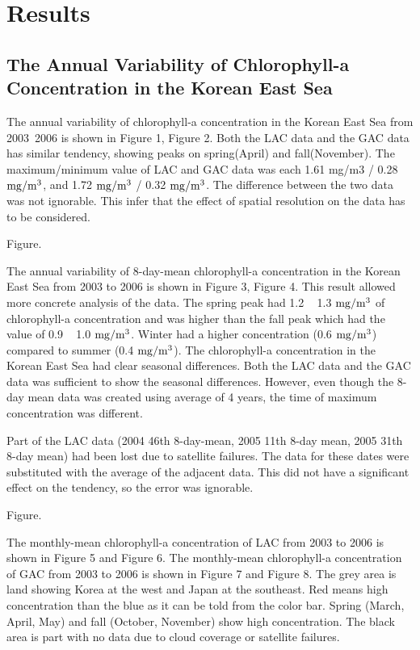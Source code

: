 \section{Results}
 
\subsection{The Annual Variability of Chlorophyll-a Concentration in the Korean East Sea}
 
The annual variability of chlorophyll-a concentration in the Korean East Sea from 2003~2006 is shown in Figure 1, Figure 2. Both the LAC data and the GAC data has similar tendency, showing peaks on spring(April) and fall(November). The maximum/minimum value of LAC and GAC data was each 1.61 mg/m3 / 0.28 $\rm mg/m^3$, and 1.72 $\rm mg/m^3$ / 0.32 $\rm mg/m^3$. The difference between the two data was not ignorable. This infer that the effect of spatial resolution on the data has to be considered.
  
 Figure.
 
The annual variability of 8-day-mean chlorophyll-a concentration in the Korean East Sea from 2003 to 2006 is shown in Figure 3, Figure 4. This result allowed more concrete analysis of the data. The spring peak had 1.2 ~ 1.3 $\rm mg/m^3$ of chlorophyll-a concentration and was higher than the fall peak which had the value of 0.9 ~ 1.0 $\rm mg/m^3$. Winter had a higher concentration (0.6 $\rm mg/m^3$) compared to summer (0.4 $\rm mg/m^3$). The chlorophyll-a concentration in the Korean East Sea had clear seasonal differences. Both the LAC data and the GAC data was sufficient to show the seasonal differences. However, even though the 8-day mean data was created using average of 4 years, the time of maximum concentration was different. 

Part of the LAC data (2004 46th 8-day-mean, 2005 11th 8-day mean, 2005 31th 8-day mean) had been lost due to satellite failures. The data for these dates were substituted with the average of the adjacent data. This did not have a significant effect on the tendency, so the error was ignorable.
  
  Figure.
 
The monthly-mean chlorophyll-a concentration of LAC from 2003 to 2006 is shown in Figure 5 and Figure 6. The monthly-mean chlorophyll-a concentration of GAC from 2003 to 2006 is shown in Figure 7 and Figure 8. The grey area is land showing Korea at the west and Japan at the southeast. Red means high concentration than the blue as it can be told from the color bar. Spring (March, April, May) and fall (October, November) show high concentration. The black area is part with no data due to cloud coverage or satellite failures. 
  

